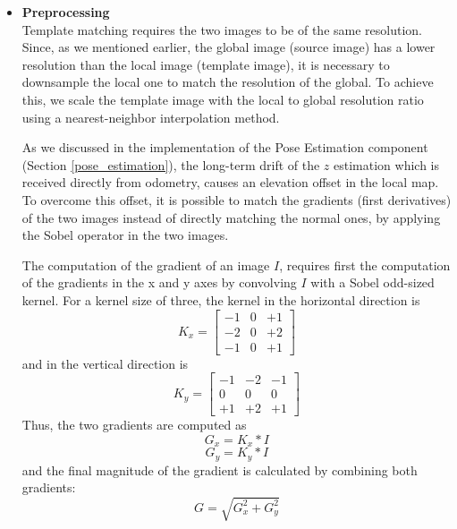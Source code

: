 \begin{itemize}
    \item \textbf{Preprocessing} \\
        Template matching requires the two images to be of the same resolution.
        Since, as we mentioned earlier, the global image (source image) has a
        lower resolution than the local image (template image), it is necessary
        to downsample the local one to match the resolution of the global.
        To achieve this, we scale the template image with the local to global
        resolution ratio using a nearest-neighbor interpolation method.


        As we discussed in the implementation of the Pose Estimation component
        (Section \ref{pose_estimation}), the long-term drift of the $z$
        estimation which is received directly from odometry, causes an
        elevation offset in the local map.
        To overcome this offset, it is possible to match the gradients
        (first derivatives) of the two images instead of directly matching
        the normal ones, by applying the Sobel operator in the two images.

        The computation of the gradient of an image $I$, requires first the
        computation of the gradients in the x and y axes by convolving $I$
        with a Sobel odd-sized kernel. For a kernel size of
        three, the kernel in the horizontal direction is
        \begin{equation}
            K_x =
            \begin{bmatrix}
                -1 & 0 & +1 \\
                -2 & 0 & +2 \\
                -1 & 0 & +1
            \end{bmatrix}
        \end{equation}
        and in the vertical direction is
        \begin{equation}
            K_y =
            \begin{bmatrix}
                -1 & -2 & -1 \\
                0 & 0 & 0 \\
                +1 & +2 & +1
            \end{bmatrix}
        \end{equation}
        Thus, the two gradients are computed as
        \begin{equation}
            G_x = K_x * I
        \end{equation}
        \begin{equation}
            G_y = K_y * I
        \end{equation}
        and the final magnitude of the gradient is calculated by
        combining both gradients:
        \begin{equation}
            G = \sqrt{G_x^2 + G_y^2}
        \end{equation}


\end{itemize}
